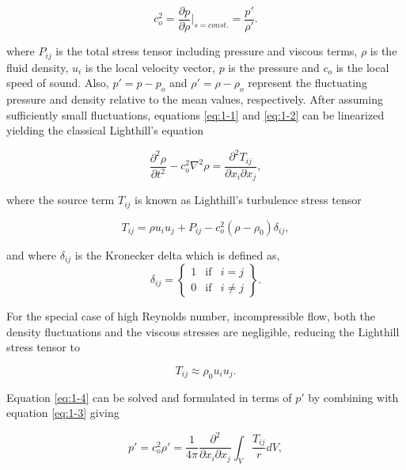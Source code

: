 \begin{equation} \label{eq:1-3}
	c_o^2 = \frac{\partial p}{\partial \rho}|_{s=const.} = \frac{p'}{\rho'}.
\end{equation}

where $P_{ij}$ is the total stress tensor including pressure and viscous terms, $\rho$ is the fluid density, $u_i$ is the local velocity vector, $p$ is the pressure and $c_o$ is the local speed of sound. Also, $p' = p - p_o$ and $\rho' = \rho - \rho_o$ represent the fluctuating pressure and density relative to the mean values, respectively. After assuming sufficiently small fluctuations, equations \ref{eq:1-1} and \ref{eq:1-2} can be linearized yielding the classical Lighthill's equation

\begin{equation} \label{eq:1-4}
\frac{\partial^2 \rho}{\partial t^2} - c_o^2 \nabla^2 \rho = \frac{\partial^2 T_{ij}}{\partial x_i \partial x_j},
\end{equation}

where the source term $T_{ij}$ is known as Lighthill's turbulence stress tensor

\begin{equation}
T_{ij} = \rho u_i u_j + P_{ij} - c_o^2(\rho - \rho_0) \delta_{ij},
\end{equation}

and where $\delta_{ij}$ is the Kronecker delta which is defined as,
\begin{equation}
\delta_{ij} = \left\{
\begin{array}{lcr}
1 & \mbox{if} & i = j \\
0 & \mbox{if} & i \neq j
\end{array}
\right\}.
\end{equation}

For the special case of high Reynolds number, incompressible flow, both the density fluctuations and the viscous stresses are negligible, reducing the Lighthill stress tensor to

\begin{equation}
T_{ij} \approx \rho_0 u_i u_j.
\end{equation}

Equation \ref{eq:1-4} can be solved and formulated in terms of $p'$ by combining with equation \ref{eq:1-3} giving

\begin{equation}
p' = c_o^2 \rho' = \frac{1}{4\pi} \frac{\partial^2}{\partial x_i \partial x_j} \int_{V} \frac{T_{ij}}{r}dV,
\end{equation}

